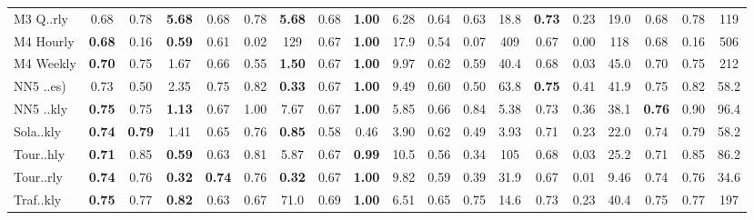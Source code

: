 \begin{tabular}{l|ccc|ccc|ccc|ccc|ccc||ccc}
        M3 Q..rly & 0.68 & 0.78 & \textbf{5.68} & 0.68 & 0.78 & \textbf{5.68} & 0.68 & \textbf{1.00} & 6.28 & 0.64 & 0.63 & 18.8 & \textbf{0.73} & 0.23 & 19.0 & 0.68 & 0.78 & 119 \\
        M4 Hourly & \textbf{0.68} & 0.16 & \textbf{0.59} & 0.61 & 0.02 & 129 & 0.67 & \textbf{1.00} & 17.9 & 0.54 & 0.07 & 409 & 0.67 & 0.00 & 118 & 0.68 & 0.16 & 506 \\
        M4 Weekly & \textbf{0.70} & 0.75 & 1.67 & 0.66 & 0.55 & \textbf{1.50} & 0.67 & \textbf{1.00} & 9.97 & 0.62 & 0.59 & 40.4 & 0.68 & 0.03 & 45.0 & 0.70 & 0.75 & 212 \\
        NN5 ..es) & 0.73 & 0.50 & 2.35 & 0.75 & 0.82 & \textbf{0.33} & 0.67 & \textbf{1.00} & 9.49 & 0.60 & 0.50 & 63.8 & \textbf{0.75} & 0.41 & 41.9 & 0.75 & 0.82 & 58.2 \\
        NN5 ..kly & \textbf{0.75} & 0.75 & \textbf{1.13} & 0.67 & 1.00 & 7.67 & 0.67 & \textbf{1.00} & 5.85 & 0.66 & 0.84 & 5.38 & 0.73 & 0.36 & 38.1 & \textbf{0.76} & 0.90 & 96.4 \\
        Sola..kly & \textbf{0.74} & \textbf{0.79} & 1.41 & 0.65 & 0.76 & \textbf{0.85} & 0.58 & 0.46 & 3.90 & 0.62 & 0.49 & 3.93 & 0.71 & 0.23 & 22.0 & 0.74 & 0.79 & 58.2 \\
        Tour..hly & \textbf{0.71} & 0.85 & \textbf{0.59} & 0.63 & 0.81 & 5.87 & 0.67 & \textbf{0.99} & 10.5 & 0.56 & 0.34 & 105 & 0.68 & 0.03 & 25.2 & 0.71 & 0.85 & 86.2 \\
        Tour..rly & \textbf{0.74} & 0.76 & \textbf{0.32} & \textbf{0.74} & 0.76 & \textbf{0.32} & 0.67 & \textbf{1.00} & 9.82 & 0.59 & 0.39 & 31.9 & 0.67 & 0.01 & 9.46 & 0.74 & 0.76 & 34.6 \\
        Traf..kly & \textbf{0.75} & 0.77 & \textbf{0.82} & 0.63 & 0.67 & 71.0 & 0.69 & \textbf{1.00} & 6.51 & 0.65 & 0.75 & 14.6 & 0.73 & 0.23 & 40.4 & 0.75 & 0.77 & 197 \\
        \bottomrule
    \end{tabular}